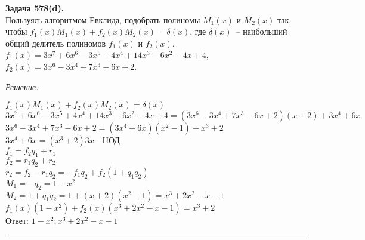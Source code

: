 \documentclass[a4paper, 12pt]{article}
\newenvironment{problem}[2][Задача]
    { \begin{mdframed}[backgroundcolor=gray!10] \textbf{#1 #2.} \\}
    {  \end{mdframed}}
\newenvironment{solution}
    {\textit{Решение: }}
    {\noindent\rule{7in}{1.5pt}}
\begin{document}
\begin{problem}{578(d)}
Пользуясь алгоритмом Евклида, подобрать полиномы $M_1(x)$ и $M_2(x)$ так,
чтобы $f_1(x)M_1(x)+f_2(x)M_2(x)=\delta(x)$, где $\delta(x)$~-- наибольший общий делитель полиномов $f_1(x)$ и $f_2(x)$.\\
$f_1(x)=3x^7+6x^6-3x^5+4x^4+14x^3-6x^2-4x+4$, \\ $f_2(x)=3x^6-3x^4+7x^3-6x+2$.
\end{problem}
\begin{solution}

$\displaystyle f_1(x)M_1(x) + f_2(x)M_2(x) = \delta(x)$
\\
$\displaystyle 3x^7+6x^6-3x^5+4x^4+14x^3-6x^2-4x+4 = (3x^6-3x^4+7x^3-6x+2)(x + 2) + 3x^4 + 6x$
\\
$\displaystyle 3x^6-3x^4+7x^3-6x+2 = (3x^4 + 6x)(x^2 - 1) + x^3 + 2$
\\
$\displaystyle 3x^4 + 6x = (x^3 + 2)3x \text{ - НОД}$
\\
$\displaystyle f_1 = f_2q_1 + r_1$
\\
$\displaystyle f_2 = r_1q_2 + r_2$
\\
$\displaystyle r_2 = f_2 - r_1q_2 = -f_1q_2 + f_2(1 + q_1q_2)$
\\
$\displaystyle M_1 = -q_2 = 1 - x^2$
\\
$\displaystyle M_2 = 1 + q_1q_2 = 1 + (x + 2)(x^2 - 1) = x^3 + 2x^2 - x - 1$
\\
$\displaystyle f_1(x)(1 - x^2) + f_2(x)(x^3 + 2x^2 - x - 1) = x^3 + 2$
\\
Ответ: $\displaystyle 1 - x^2; x^3 + 2x^2 - x - 1$

\end{solution}
\end{document}

